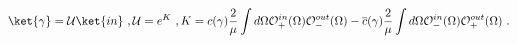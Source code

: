 \begin{equation}
\ket{\gamma}=\mathcal{U}\ket{in} \ ,
\mathcal{U}=e^K \ ,
K=c(\gamma)\frac{2}{\mu}\int d\Omega
\mathcal{O}^{in}_+(\Omega)
\mathcal{O}_-^{out}(\Omega)-
\overline{c}(\gamma)\frac{2}{\mu}\int d\Omega
\mathcal{O}^{in}_-(\Omega)
\mathcal{O}_+^{out}(\Omega) \ .
\end{equation}

